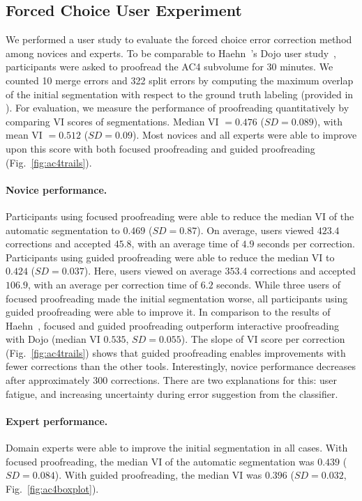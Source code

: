 \subsection{Forced Choice User Experiment}
We performed a user study to evaluate the forced choice error correction method among novices and experts. To be comparable to Haehn~\etal's Dojo user study~\cite{haehn_dojo_2014}, participants were asked to proofread the AC4 subvolume for 30 minutes. We counted 10 merge errors and 322 split errors by computing the maximum overlap of the initial segmentation with respect to the ground truth labeling (provided in \cite{haehn_dojo_2014}). For evaluation, we measure the performance of proofreading quantitatively by comparing VI scores of segmentations. Median VI $=0.476$ ($SD=0.089$), with mean VI $=0.512$ ($SD=0.09$). Most novices and all experts were able to improve upon this score with both focused proofreading and guided proofreading (Fig.~\ref{fig:ac4trails}).

\paragraph{Novice performance.} Participants using focused proofreading were able to reduce the median VI of the automatic segmentation to $0.469$ ($SD=0.87$). On average, users viewed $423.4$ corrections and accepted $45.8$, with an average time of $4.9$ seconds per correction. Participants using guided proofreading were able to reduce the median VI to $0.424$ ($SD=0.037$). Here, users viewed on average $353.4$ corrections and accepted $106.9$, with an average per correction time of $6.2$ seconds. While three users of focused proofreading made the initial segmentation worse, all participants using guided proofreading were able to improve it. In comparison to the results of Haehn~\etal, focused and guided proofreading outperform interactive proofreading with Dojo (median VI $0.535$, $SD=0.055$). The slope of VI score per correction (Fig.~\ref{fig:ac4trails}) shows that guided proofreading enables improvements with fewer corrections than the other tools. Interestingly, novice performance decreases after approximately $300$ corrections. There are two explanations for this: user fatigue, and increasing uncertainty during error suggestion from the classifier. %

\paragraph{Expert performance.} Domain experts were able to improve the initial segmentation in all cases. With focused proofreading, the median VI of the automatic segmentation was $0.439$ ($SD=0.084$). With guided proofreading, the median VI was $0.396$ ($SD=0.032$, Fig.~\ref{fig:ac4boxplot}).

